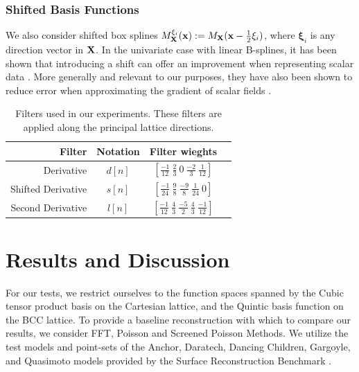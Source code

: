 \subsubsection{Shifted Basis Functions}
We also consider shifted box splines $M_{\mathbf{\mathbf{X}}}^{\xi_i}(\mathbf{x}) := M_{\mathbf{\mathbf{X}}}(\mathbf{x} - \frac{1}{2}\mathbf{\xi}_i)$, where $\mathbf{\xi}_i$ is any direction vector in $\mathbf{\mathbf{X}}$. In the univariate case with linear B-splines, it has been shown that introducing a shift can offer an improvement when representing scalar data \cite{linearrev}. More generally and relevant to our purposes, they have also been shown to reduce error when approximating the gradient of scalar fields \cite{gradrev}.

\begin{table}[!t]
	\renewcommand{\arraystretch}{1.5}
	\centering
	\begin{tabular}{|r||c||c|c|}
		\hline
		Filter & Notation & Filter wieghts  \\
		\hline
		\hline
		Derivative & $d[n]$ & $[\frac{-1}{12} \ \frac{2}{3} \ 0 \ \frac{-2}{3} \ \frac{1}{12}]$ \\
		\hline
		Shifted Derivative & $s[n]$  & $[\frac{-1}{24} \ \frac{9}{8} \ \frac{-9}{8} \ \frac{1}{24} \ 0]$ \\
		\hline
		Second Derivative & $l[n]$  & $[\frac{-1}{12} \ \frac{4}{3} \ \frac{-5}{2} \ \frac{4}{3} \ \frac{-1}{12}]$ \\
		\hline
	\end{tabular}
	\caption{Filters used in our experiments. These filters are applied along the principal lattice directions.}
	\label{tab:filters}
\end{table}

\section{Results and Discussion}
For our tests, we restrict ourselves to the function spaces spanned by the Cubic tensor product basis on the Cartesian lattice, and the Quintic basis function on the BCC lattice. To provide a baseline reconstruction with which to compare our results, we consider FFT, Poisson and Screened Poisson Methods. We utilize the test models and point-sets of the Anchor, Daratech, Dancing Children, Gargoyle, and Quasimoto models provided by the Surface Reconstruction Benchmark \cite{reconbench}.

